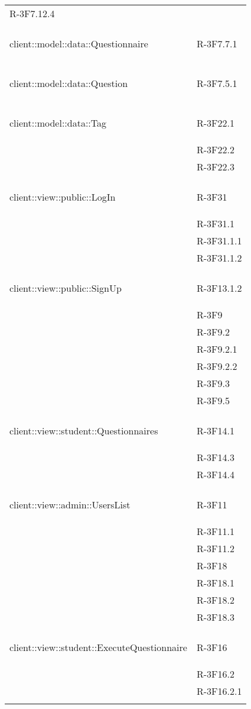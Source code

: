 \begin{longtable}{l p{3cm}}
	R-3F7.12.4 \tabularnewline &\tabularnewline
	\hline
	\hypertarget{client::model::data::Questionnaire}{client::model::data::Questionnaire} & R-3F7.7.1 \tabularnewline &\tabularnewline
	\hline
	\hypertarget{client::model::data::Question}{client::model::data::Question} & R-3F7.5.1 \tabularnewline &\tabularnewline
	\hline
	\hypertarget{client::model::data::Tag}{client::model::data::Tag} & R-3F22.1 \tabularnewline &
	
	R-3F22.2 \tabularnewline &
	
	R-3F22.3 \tabularnewline &\tabularnewline
	\hline
	\hypertarget{client::view::public::LogIn}{client::view::public::LogIn} & R-3F31 \tabularnewline &
	
	R-3F31.1 \tabularnewline &
	
	R-3F31.1.1 \tabularnewline &
	
	R-3F31.1.2 \tabularnewline &\tabularnewline
	\hline
	\hypertarget{client::view::public::SignUp}{client::view::public::SignUp} & R-3F13.1.2 \tabularnewline &
	
	R-3F9 \tabularnewline &
	
	R-3F9.2 \tabularnewline &
	
	R-3F9.2.1 \tabularnewline &
	
	R-3F9.2.2 \tabularnewline &
	
	R-3F9.3 \tabularnewline &
	
	R-3F9.5 \tabularnewline &\tabularnewline
	\hline
	\hypertarget{client::view::student::Questionnaires}{client::view::student::Questionnaires} & R-3F14.1 \tabularnewline &
	
	R-3F14.3 \tabularnewline &
	
	R-3F14.4 \tabularnewline &\tabularnewline
	\hline
	\hypertarget{client::view::admin::UsersList}{client::view::admin::UsersList} & R-3F11 \tabularnewline &
	
	R-3F11.1 \tabularnewline &
	
	R-3F11.2 \tabularnewline &
	
	R-3F18 \tabularnewline &
	
	R-3F18.1 \tabularnewline &
	
	R-3F18.2 \tabularnewline &
	
	R-3F18.3 \tabularnewline &\tabularnewline
	\hline
	\hypertarget{client::view::student::ExecuteQuestionnaire}{client::view::student::ExecuteQuestionnaire} & R-3F16 \tabularnewline &
	
	R-3F16.2 \tabularnewline &
	
	R-3F16.2.1 \tabularnewline &
	

\end{longtable}
